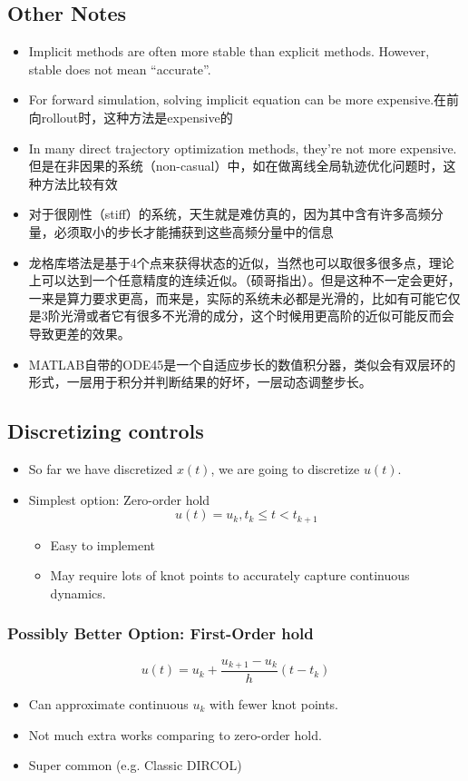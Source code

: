 \subsection{Other Notes}
\begin{itemize}
    \item Implicit methods are often more stable than explicit methods. However, stable does not mean ``accurate''.
    \item For forward simulation, solving implicit equation can be more expensive.在前向rollout时，这种方法是expensive的
    \item In many direct trajectory optimization methods, they're not more expensive. 但是在非因果的系统（non-casual）中，如在做离线全局轨迹优化问题时，这种方法比较有效
    \item 对于很刚性（stiff）的系统，天生就是难仿真的，因为其中含有许多高频分量，必须取小的步长才能捕获到这些高频分量中的信息
    \item 龙格库塔法是基于4个点来获得状态的近似，当然也可以取很多很多点，理论上可以达到一个任意精度的连续近似。（硕哥指出）。但是这种不一定会更好，一来是算力要求更高，而来是，实际的系统未必都是光滑的，比如有可能它仅是3阶光滑或者它有很多不光滑的成分，这个时候用更高阶的近似可能反而会导致更差的效果。
    \item MATLAB自带的ODE45是一个自适应步长的数值积分器，类似会有双层环的形式，一层用于积分并判断结果的好坏，一层动态调整步长。
\end{itemize}
\subsection{Discretizing controls}
\begin{itemize}
    \item So far we have discretized $x(t)$, we are going to discretize $u(t)$.
    \item Simplest option: Zero-order hold
          \begin{equation}
              u(t) = u_k, t_k \le t < t_{k+1}
          \end{equation}
          \begin{itemize}
              \item Easy to implement
              \item May require lots of knot points to accurately capture continuous dynamics.
          \end{itemize}
\end{itemize}
\subsubsection{Possibly Better Option: First-Order hold}
\begin{equation}
    u(t) = u_k + \frac{u_{k+1}-u_k}{h} (t-t_k)
\end{equation}
\begin{itemize}
    \item Can approximate continuous $u_k$ with fewer knot points.
    \item Not much extra works comparing to zero-order hold.
    \item Super common (e.g. Classic DIRCOL)
\end{itemize}
